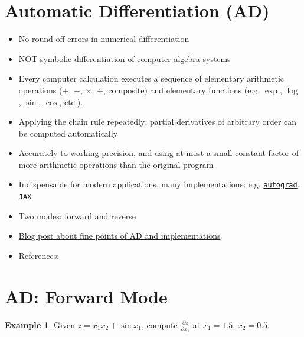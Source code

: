 \documentclass[10pt]{extarticle}
\newcommand{\ds}{\displaystyle}
\theoremstyle{definition}
\newtheorem*{ex}{Example}
\begin{document}
\newpage

\section*{Automatic Differentiation (AD)}

\begin{itemize}
  \item No round-off errors in numerical differentiation
  \item NOT symbolic differentiation of computer algebra systems
  \item Every computer calculation executes a sequence of elementary arithmetic operations ($+$, $-$, $\times$, $\div$, composite) and elementary functions (e.g. $\exp$, $\log$, $\sin$, $\cos$, etc.). 
  \item Applying the chain rule repeatedly; partial derivatives of arbitrary order can be computed automatically
  \item Accurately to working precision, and using at most a small constant factor of more arithmetic operations than the original program
  \item Indispensable for modern applications, many implementations: e.g. \href{https://github.com/HIPS/autograd}{{\tt autograd}}, \href{https://github.com/google/jax}{{\tt JAX}}
  \item Two modes: forward and reverse
  \item \href{https://jingnanshi.com/blog/autodiff.html}{Blog post about fine points of AD and implementations}
  \item References: \citet{naumann,griewank}
\end{itemize}

\newpage

\section*{AD: Forward Mode}

\begin{ex}
  Given $\ds z = x_1 x_2 + \sin x_1$, compute $\ds\frac{\partial z}{\partial x_1}$ at $x_1 = 1.5$, $x_2 = 0.5$.
\end{ex}
\end{document}
